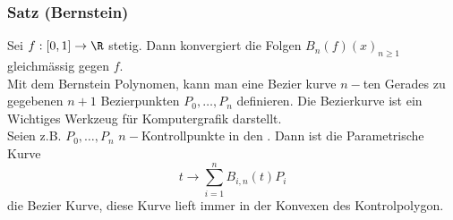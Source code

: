 \subsubsection*{Satz (Bernstein)}
Sei $f:\lbrack 0,1\rbrack\to\R$ stetig. Dann konvergiert die Folgen $B_n\left( f\right)(x)_{n\geq 1}$ gleichmässig gegen $f$.\\

Mit dem Bernstein Polynomen, kann man eine Bezier kurve $n-$ten Gerades zu gegebenen $n+1$  Bezierpunkten $P_0,\dots,P_n$ definieren. Die Bezierkurve ist ein Wichtiges Werkzeug für Komputergrafik darstellt.\\

Seien z.B. $P_0,\dots,P_n$ $n-$Kontrollpunkte in den . Dann ist die Parametrische Kurve 
\[t \to \sum\limits_{i = 1}^n {{B_{i,n}}\left( t \right){P_i}} \]
die Bezier Kurve, diese Kurve lieft immer in der Konvexen  des Kontrolpolygon. 